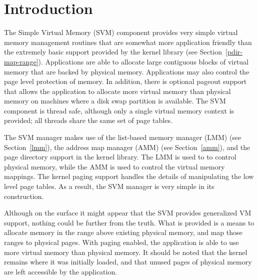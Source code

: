 %
% 
%
\label{svm}

\section{Introduction}

The Simple Virtual Memory (SVM) component provides very simple virtual
memory management routines that are somewhat more application friendly than
the extremely basic support provided by the kernel library (see
Section~\ref{pdir-map-range}).
Applications are able to allocate large contiguous
blocks of virtual memory that are backed by physical memory. Applications
may also control the page level protection of memory. In addition, there is
optional pageout support that allows the application to allocate more
virtual memory than physical memory on machines where a disk swap partition
is available. The SVM component is thread safe, although only a single
virtual memory context is provided; all threads share the same set of page
tables. 

The SVM manager makes use of the list-based memory manager (LMM) (see
Section~\ref{lmm}), the address map manager (AMM) (see Section~\ref{amm}),
and the page directory support in the kernel library. The LMM is used to to
control physical memory, while the AMM is used to control the virtual
memory mappings. The kernel paging support handles the details of
manipulating the low level page tables. As a result, the SVM manager is
very simple in its construction.

Although on the surface it might appear that the SVM provides generalized
VM support, nothing could be further from the truth. What is provided is a
means to allocate memory in the range above existing physical memory, and
map those ranges to physical pages. With paging enabled, the application is
able to use more virtual memory than physical memory. It should be noted
that the kernel remains where it was initially loaded, and that unused
pages of physical memory are left accessible by the application. 

